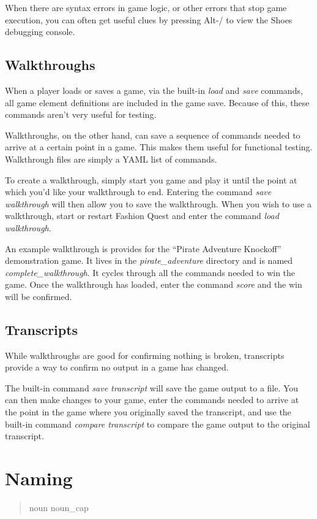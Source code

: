 \documentclass[letterpaper,10pt,english]{manual}
\begin{document}
When there are syntax errors in game logic, or other errors that stop game execution, you can often get useful clues by pressing Alt-/ to view the Shoes debugging console.


\subsection{Walkthroughs}

When a player loads or saves a game, via the built-in \emph{load} and \emph{save} commands, all game element definitions are included in the game save. Because of this, these commands aren't very useful for testing.

Walkthroughs, on the other hand, can save a sequence of commands needed to arrive at a certain point in a game. This makes them useful for functional testing. Walkthrough files are simply a YAML list of commands.

To create a walkthrough, simply start you game and play it until the point at which you'd like your walkthrough to end. Entering the command \emph{save walkthrough} will then allow you to save the walkthrough. When you wish to use a walkthrough, start or restart Fashion Quest and enter the command \emph{load walkthrough}.

An example walkthrough is provides for the ``Pirate Adventure Knockoff'' demonstration game. It lives in the \emph{pirate\_adventure} directory and is named \emph{complete\_walkthrough}. It cycles through all the commands needed to win the game. Once the walkthrough has loaded, enter the command \emph{score} and the win will be confirmed.


\subsection{Transcripts}

While walkthroughs are good for confirming nothing is broken, transcripts provide a way to confirm no output in a game has changed.

The built-in command \emph{save transcript} will save the game output to a file. You can then make changes to your game, enter the commands needed to arrive at the point in the game where you originally saved the transcript, and use the built-in command \emph{compare transcript} to compare the game output to the original transcript.


\section{Naming}
\begin{quote}

noun      noun\_cap
\end{quote}
\end{document}
